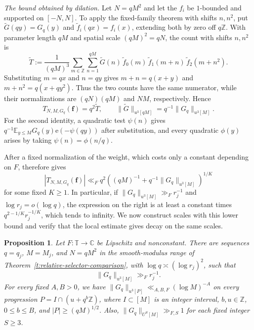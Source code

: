 \documentclass[12pt]{amsart}
\newcommand{\1}{\mathbf 1}
\newcommand{\e}{\mathrm e}
\newtheorem{proposition}[theorem]{Proposition}
\theoremstyle{definition}
\begin{document}
\medskip
\noindent\emph{The bound obtained by dilation.}
Let \(N=qM^2\) and let the \(f_i\) be \(1\)-bounded and supported
on \([-N,N]\). To apply the fixed-family theorem with shifts
\(n,n^2\), put \(\widetilde G(qy)=G_q(y)\) and
\(\widetilde f_i(qx)=f_i(x)\), extending both by zero off
\(q\mathbb Z\). With parameter length \(qM\) and spatial scale \((qM)^2=qN\),
the count with shifts \(n,n^2\) is
\[
 \widetilde T
 :=\frac{1}{(qM)^3}
 \sum_{m\in\mathbb Z}\sum_{n=1}^{qM}
 \widetilde G(n)\,\widetilde f_0(m)\,
 \widetilde f_1(m+n)\,\widetilde f_2(m+n^2).
\]
Substituting \(m=qx\) and
\(n=qy\) gives \(m+n=q(x+y)\) and \(m+n^2=q(x+qy^2)\).
Thus the two counts have the same numerator, while their
normalizations are \((qN)(qM)\) and \(NM\), respectively. Hence
\begin{equation}\label{e:lift-form}
 T_{N,M,G_q}(\mathbf f)=q^2\widetilde T,
 \qquad
 \|\widetilde G\|_{u^3[qM]}=q^{-1}\|G_q\|_{u^3[M]}.
\end{equation}
For the second identity, a quadratic test \(\psi(n)\) gives
\(q^{-1}\mathbb E_{y\leq M}G_q(y)\e(-\psi(qy))\) after
substitution, and every quadratic \(\phi(y)\) arises by taking
\(\psi(n)=\phi(n/q)\).

After a fixed normalization of the weight, which costs only
a constant depending on \(F\), \cite[Theorem~4.1]{Teravainen}
therefore gives
\begin{equation}\label{e:lift-teravainen-bound}
 |T_{N,M,G_q}(\mathbf f)|
 \ll_F q^2\left((qM)^{-1}
          +q^{-1}\|G_q\|_{u^3[M]}\right)^{1/K}
\end{equation}
for some fixed \(K\geq1\). In particular, if
\(\|G_q\|_{u^3[M]}\gg_F r_j^{-1}\) and
\(\log r_j=o(\log q)\), the expression on the right is at least
a constant times \(q^{2-1/K}r_j^{-1/K}\), which tends to infinity.
We now construct scales with this lower bound and verify that
the local estimate gives decay on the same scales.

\begin{proposition}\label{p:separating-family}
Let $F:\mathbb T\to\mathbb C$ be Lipschitz and nonconstant.
There are sequences $q=q_j$, $M=M_j$, and $N=qM^2$ in the
smooth-modulus range of Theorem~\ref{t:relative-selector-comparison},
with $\log q\asymp(\log r_j)^2$, such that
\begin{equation}\label{e:separating-global-u}
 \|G_q\|_{u^3[M]}\gg_F r_j^{-1}.
\end{equation}
For every fixed $A,B>0$, we have
$\|G_q\|_{u^3[P]}\ll_{A,B,F}(\log M)^{-A}$ on every progression
$P=I\cap(u+q^b\mathbb Z)$, where $I\subset[M]$ is an integer
interval, $b,u\in\mathbb Z$, $0\leq b\leq B$, and
$|P|\geq(qM)^{1/2}$. Also, $\|G_q\|_{U^S[M]}\gg_{F,S}1$
for each fixed integer $S\geq3$.
\end{proposition}
\end{document}
